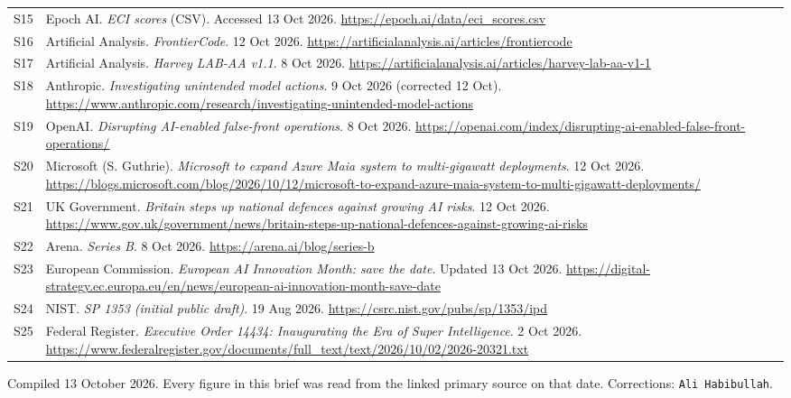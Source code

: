 \documentclass[11pt,a4paper]{article}
\newcommand{\briefdate}{13 October 2026}
\newcommand{\briefauthor}{Ali Habibullah}
\begin{document}
{\begin{tabularx}{\textwidth}{@{}l X@{}}
S15 & Epoch AI. \emph{ECI scores} (CSV). Accessed 13 Oct 2026. \url{https://epoch.ai/data/eci_scores.csv} \\
S16 & Artificial Analysis. \emph{FrontierCode}. 12 Oct 2026. \url{https://artificialanalysis.ai/articles/frontiercode} \\
S17 & Artificial Analysis. \emph{Harvey LAB-AA v1.1}. 8 Oct 2026. \url{https://artificialanalysis.ai/articles/harvey-lab-aa-v1-1} \\
S18 & Anthropic. \emph{Investigating unintended model actions}. 9 Oct 2026 (corrected 12 Oct). \url{https://www.anthropic.com/research/investigating-unintended-model-actions} \\
S19 & OpenAI. \emph{Disrupting AI-enabled false-front operations}. 8 Oct 2026. \url{https://openai.com/index/disrupting-ai-enabled-false-front-operations/} \\
S20 & Microsoft (S. Guthrie). \emph{Microsoft to expand Azure Maia system to multi-gigawatt deployments}. 12 Oct 2026. \url{https://blogs.microsoft.com/blog/2026/10/12/microsoft-to-expand-azure-maia-system-to-multi-gigawatt-deployments/} \\
S21 & UK Government. \emph{Britain steps up national defences against growing AI risks}. 12 Oct 2026. \url{https://www.gov.uk/government/news/britain-steps-up-national-defences-against-growing-ai-risks} \\
S22 & Arena. \emph{Series B}. 8 Oct 2026. \url{https://arena.ai/blog/series-b} \\
S23 & European Commission. \emph{European AI Innovation Month: save the date}. Updated 13 Oct 2026. \url{https://digital-strategy.ec.europa.eu/en/news/european-ai-innovation-month-save-date} \\
S24 & NIST. \emph{SP 1353 (initial public draft)}. 19 Aug 2026. \url{https://csrc.nist.gov/pubs/sp/1353/ipd} \\
S25 & Federal Register. \emph{Executive Order 14434: Inaugurating the Era of Super Intelligence}. 2 Oct 2026. \url{https://www.federalregister.gov/documents/full_text/text/2026/10/02/2026-20321.txt} \\
\bottomrule
\end{tabularx}}

\vspace{0.8em}
{\footnotesize\color{brandgrey}
Compiled \briefdate. Every figure in this brief was read from the linked primary
source on that date. Corrections: \texttt{\briefauthor}.}
\end{document}

